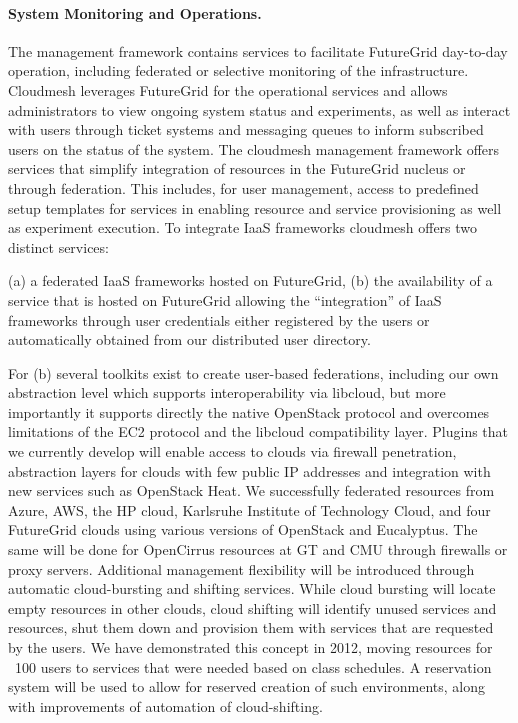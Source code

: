 \documentclass{article}
\begin{document}
\paragraph{System Monitoring and Operations.}

The management framework contains services to facilitate FutureGrid day-to-day operation, including federated or selective monitoring of the infrastructure. Cloudmesh leverages FutureGrid for the operational services and allows administrators to view ongoing system status and experiments, as well as interact with users through ticket systems and messaging queues to inform subscribed users on the status of the system.
The cloudmesh management framework offers services that simplify integration of resources in the FutureGrid nucleus or through federation. This includes, for user management, access to predefined setup templates for services in enabling resource and service provisioning as well as experiment execution. To integrate IaaS frameworks cloudmesh offers two distinct services:

(a) a federated IaaS frameworks hosted on FutureGrid,
(b) the availability of a service that is hosted on FutureGrid allowing the “integration” of IaaS frameworks through user credentials either registered by the users or automatically obtained from our distributed user directory.

For (b) several toolkits exist to create user-based federations, including our own abstraction level which supports interoperability via libcloud, but more importantly it supports directly the native OpenStack protocol and overcomes limitations of the EC2 protocol and the libcloud compatibility layer. Plugins that we currently develop will enable access to clouds via firewall penetration, abstraction layers for clouds with few public IP addresses and integration with new services such as OpenStack Heat. We successfully federated resources from Azure, AWS, the HP cloud, Karlsruhe Institute of Technology Cloud, and four FutureGrid clouds using various versions of OpenStack and Eucalyptus. The same will be done for OpenCirrus resources at GT and CMU through firewalls or proxy servers.
Additional management flexibility will be introduced through automatic cloud-bursting and shifting services. While cloud bursting will locate empty resources in other clouds, cloud shifting will identify unused services and resources, shut them down and provision them with services that are requested by the users. We have demonstrated this concept in 2012, moving resources for ~100 users to services that were needed based on class schedules. A reservation system will be used to allow for reserved creation of such environments, along with improvements of automation of cloud-shifting.
\end{document}
